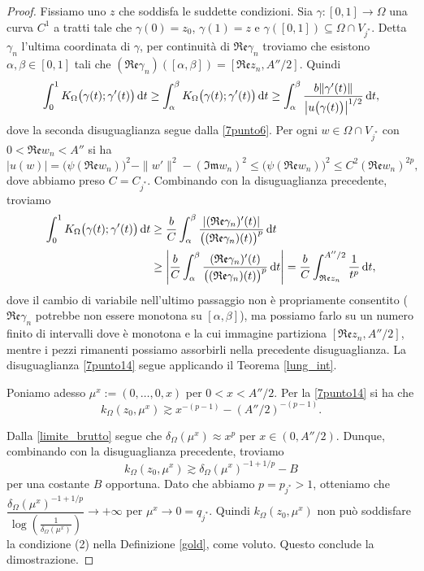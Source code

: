 \begin{proof}
    Fissiamo uno $z$ che soddisfa le suddette condizioni. Sia $\gamma:[0,1]\longrightarrow\Omega$ una curva $C^1$ a tratti tale che $\gamma(0)=z_0$, $\gamma(1)=z$ e $\gamma([0,1])\subseteq\Omega\cap V_{j^*}$. Detta $\gamma_n$ l'ultima coordinata di $\gamma$, per continuità di $\mathfrak{Re}\gamma_n$ troviamo che esistono $\alpha,\beta\in[0,1]$ tali che $(\mathfrak{Re}\gamma_n)([\alpha,\beta])=[\mathfrak{Re}z_n,A''/2]$. Quindi
    $$\int_0^1 K_\Omega\big(\gamma(t);\gamma'(t)\big)\mathop{}\!\mathrm{d} t\ge\int_\alpha^\beta K_\Omega\big(\gamma(t);\gamma'(t)\big)\mathop{}\!\mathrm{d} t\ge \int_\alpha^\beta \frac{b\|\gamma'(t)\|}{\left|u\big(\gamma(t)\big)\right|^{1/2}}\mathop{}\!\mathrm{d} t,$$
    dove la seconda disuguaglianza segue dalla \eqref{7punto6}. Per ogni $w\in\Omega\cap V_{j^*}$ con $0<\mathfrak{Re}w_n<A''$ si ha
    $$|u(w)|=\big(\psi(\mathfrak{Re}w_n)\big)^2-\|w'\|^2-(\mathfrak{Im}w_n)^2 \le \big(\psi(\mathfrak{Re}w_n)\big)^2 \le C^2(\mathfrak{Re}w_n)^{2p},$$
    dove abbiamo preso $C=C_{j^*}$. Combinando con la disuguaglianza precedente, troviamo
    \begin{align*}
        \int_0^1 K_\Omega\big(\gamma(t);\gamma'(t)\big)\mathop{}\!\mathrm{d} t&\ge \frac{b}{C}\int_\alpha^\beta \frac{|(\mathfrak{Re}\gamma_n)'(t)|}{\big((\mathfrak{Re}\gamma_n)(t)\big)^p}\mathop{}\!\mathrm{d} t\\
        &\ge \left|\frac{b}{C}\int_\alpha^\beta \frac{(\mathfrak{Re}\gamma_n)'(t)}{\big((\mathfrak{Re}\gamma_n)(t)\big)^p}\mathop{}\!\mathrm{d} t\right|=\frac{b}{C}\int_{\mathfrak{Re}z_n}^{A''/2}\frac{1}{t^p}\mathop{}\!\mathrm{d} t,
    \end{align*}
    dove il cambio di variabile nell'ultimo passaggio non è propriamente consentito ($\mathfrak{Re}\gamma_n$ potrebbe non essere monotona su $[\alpha,\beta]$), ma possiamo farlo su un numero finito di intervalli dove è monotona e la cui immagine partiziona $[\mathfrak{Re}z_n,A''/2]$, mentre i pezzi rimanenti possiamo assorbirli nella precedente disuguaglianza. La disuguaglianza \eqref{7punto14} segue applicando il Teorema \ref{lung_int}.

    Poniamo adesso $\mu^x:=(0,\dots,0,x)$ per $0<x<A''/2$. Per la \eqref{7punto14} si ha che
    $$k_\Omega(z_0,\mu^x) \gtrsim x^{-(p-1)}-(A''/2)^{-(p-1)}.$$
    
    Dalla \eqref{limite_brutto} segue che $\delta_\Omega(\mu^x) \approx x^p$ per $x\in(0,A''/2)$. Dunque, combinando con la disuguaglianza precedente, troviamo
    $$k_\Omega(z_0,\mu^x) \gtrsim \delta_\Omega(\mu^x)^{-1+1/p}-B$$
    per una costante $B$ opportuna. Dato che abbiamo $p=p_{j^*}>1$, otteniamo che ${\dfrac{\delta_\Omega(\mu^x)^{-1+1/p}}{\log\left(\frac{1}{\delta_\Omega(\mu^x)}\right)}\longrightarrow +\infty}$ per $\mu^x\longrightarrow 0=q_{j^*}$. Quindi $k_\Omega(z_0,\mu^x)$ non può soddisfare la condizione (2) nella Definizione \ref{gold}, come voluto. Questo conclude la dimostrazione.
\end{proof}

